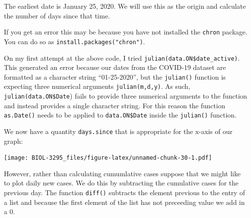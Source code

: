\documentclass[]{book}
\newenvironment{Shaded}{\begin{snugshade}}{\end{snugshade}}
\newcommand{\KeywordTok}[1]{\textcolor[rgb]{0.13,0.29,0.53}{\textbf{{#1}}}}
\newcommand{\DataTypeTok}[1]{\textcolor[rgb]{0.13,0.29,0.53}{{#1}}}
\newcommand{\StringTok}[1]{\textcolor[rgb]{0.31,0.60,0.02}{{#1}}}
\newcommand{\NormalTok}[1]{{#1}}
\begin{document}
The earliest date is January 25, 2020. We will use this as the origin
and calculate the number of days since that time.

\begin{Shaded}
\end{Shaded}

If you get an error this may be because you have not installed the
\texttt{chron} package. You can do so as
\texttt{install.packages("chron")}.

On my first attempt at the above code, I tried
\texttt{julian(data.ON\$date\_active)}. This generated an error because
our dates from the COVID-19 dataset are formatted as a character string
``01-25-2020'', but the \texttt{julian()} function is expecting three
numerical arguments \texttt{julian(m,d,y)}. As such,
\texttt{julian(data.ON\$Date}) fails to provide three numerical
arguments to the function and instead provides a single character
string. For this reason the function \texttt{as.Date()} needs to be
applied to \texttt{data.ON\$Date} inside the \texttt{julian()} function.

We now have a quantity \texttt{days.since} that is appropriate for the
x-axis of our graph:

\begin{Shaded}
\end{Shaded}

\texttt{[image: BIOL-3295\_files/figure-latex/unnamed-chunk-30-1.pdf]}

However, rather than calculating cumumlative cases suppose that we might
like to plot daily new cases. We do this by subtracting the cumulative
cases for the previous day. The function \texttt{diff()} subtracts the
element previous to the entry of a list and because the first element of
the list has not preceeding value we add in a 0.
\end{document}
